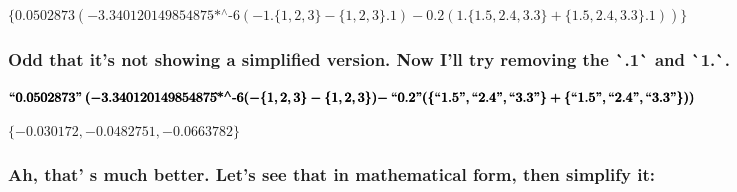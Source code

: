 \documentclass{article}
\begin{document}
\begin{doublespace}
\noindent\(\{0.0502873 (-\text{3.340120149854875$\grave{ }$*${}^{\wedge}$-6} (-1.\{1,2,3\}-\{1,2,3\}.1)-0.2 (1.\{1.5,2.4,3.3\}+\{1.5,2.4,3.3\}.1))\}\)
\end{doublespace}

\subsubsection*{Odd that it{'}s not showing a simplified version. Now I{'}ll try removing the \`{ }.1\`{ } and \`{ }1.\`{ }.}

\begin{doublespace}
\noindent\(\pmb{\text{{``}0.0502873{''}} }\\
\pmb{(-\text{3.340120149854875$\grave{ }$*${}^{\wedge}$-6} (-\{1,2,3\}-\{1,2,3\})-}\\
\pmb{\text{{``}0.2{''}} (\{\text{{``}1.5{''}},\text{{``}2.4{''}},\text{{``}3.3{''}}\}+\{\text{{``}1.5{''}},\text{{``}2.4{''}},\text{{``}3.3{''}}\}))}\)
\end{doublespace}

\begin{doublespace}
\noindent\(\{-0.030172,-0.0482751,-0.0663782\}\)
\end{doublespace}

\subsubsection*{Ah, that' s much better. Let{'}s see that in mathematical form, then simplify it:}
\end{document}
